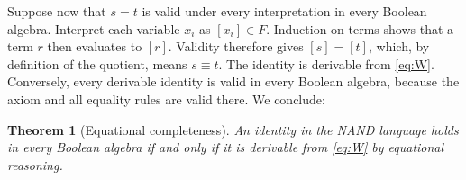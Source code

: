 \documentclass[11pt,a4paper]{article}
\newtheorem{theorem}{Theorem}
\begin{document}
Suppose now that $s=t$ is valid under every interpretation in every
Boolean algebra. Interpret each variable $x_i$ as $[x_i]\in F$.
Induction on terms shows that a term $r$ then evaluates to $[r]$.
Validity therefore gives $[s]=[t]$, which, by definition of the quotient,
means $s\equiv t$. The identity is derivable from \eqref{eq:W}.
Conversely, every derivable identity is valid in every Boolean algebra,
because the axiom and all equality rules are valid there. We conclude:
\begin{theorem}[Equational completeness]
An identity in the NAND language holds in every Boolean algebra if and
only if it is derivable from \eqref{eq:W} by equational reasoning.
\end{theorem}
\end{document}
